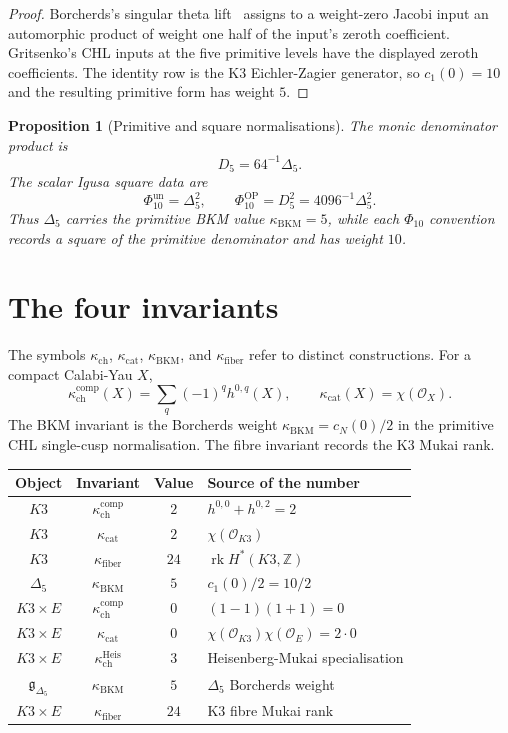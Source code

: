 \documentclass[11pt]{article}
\newtheorem{proposition}[theorem]{Proposition}
\newcommand{\kch}{\kappa_{\mathrm{ch}}}
\newcommand{\kcat}{\kappa_{\mathrm{cat}}}
\newcommand{\kBKM}{\kappa_{\mathrm{BKM}}}
\newcommand{\kfib}{\kappa_{\mathrm{fiber}}}
\newcommand{\cO}{\mathcal{O}}
\newcommand{\Z}{\mathbb{Z}}
\begin{document}
\begin{proof}
Borcherds's singular theta lift~\cite{Borcherds1998} assigns to a
weight-zero Jacobi input an automorphic product of weight one half of
the input's zeroth coefficient. Gritsenko's CHL inputs
\cite{Gritsenko1999} at the five primitive levels have the displayed
zeroth coefficients. The identity row is the K3 Eichler-Zagier
generator, so $c_1(0)=10$ and the resulting primitive form has
weight $5$.
\end{proof}

\begin{proposition}[Primitive and square normalisations]
\label{prop:delta5-square-normalisation}
The monic denominator product is
\[
  D_5=64^{-1}\Delta_5 .
\]
The scalar Igusa square data are
\[
  \Phi_{10}^{\mathrm{un}}=\Delta_5^2,\qquad
  \Phi_{10}^{\mathrm{OP}}=D_5^2=4096^{-1}\Delta_5^2 .
\]
Thus $\Delta_5$ carries the primitive BKM value
$\kBKM=5$, while each $\Phi_{10}$ convention records a square of the
primitive denominator and has weight $10$.
\end{proposition}

\section{The four invariants}
\label{sec:invariants}

The symbols $\kch$, $\kcat$, $\kBKM$, and $\kfib$ refer to distinct
constructions. For a compact Calabi-Yau $X$,
\[
  \kch^{\mathrm{comp}}(X)=\sum_q(-1)^q h^{0,q}(X),
  \qquad
  \kcat(X)=\chi(\cO_X).
\]
The BKM invariant is the Borcherds weight
$\kBKM=c_N(0)/2$ in the primitive CHL single-cusp normalisation. The
fibre invariant records the K3 Mukai rank.

\begin{center}
\begin{tabular}{c|c|c|l}
Object & Invariant & Value & Source of the number \\
\hline
$K3$ & $\kch^{\mathrm{comp}}$ & $2$ & $h^{0,0}+h^{0,2}=2$ \\
$K3$ & $\kcat$ & $2$ & $\chi(\cO_{K3})$ \\
$K3$ & $\kfib$ & $24$ & $\operatorname{rk}H^*(K3,\Z)$ \\
$\Delta_5$ & $\kBKM$ & $5$ & $c_1(0)/2=10/2$ \\
$K3\times E$ & $\kch^{\mathrm{comp}}$ & $0$ & $(1-1)(1+1)=0$ \\
$K3\times E$ & $\kcat$ & $0$ & $\chi(\cO_{K3})\chi(\cO_E)=2\cdot0$ \\
$K3\times E$ & $\kch^{\mathrm{Heis}}$ & $3$ & Heisenberg-Mukai specialisation \\
$\mathfrak g_{\Delta_5}$ & $\kBKM$ & $5$ & $\Delta_5$ Borcherds weight \\
$K3\times E$ & $\kfib$ & $24$ & K3 fibre Mukai rank
\end{tabular}
\end{center}
\end{document}
